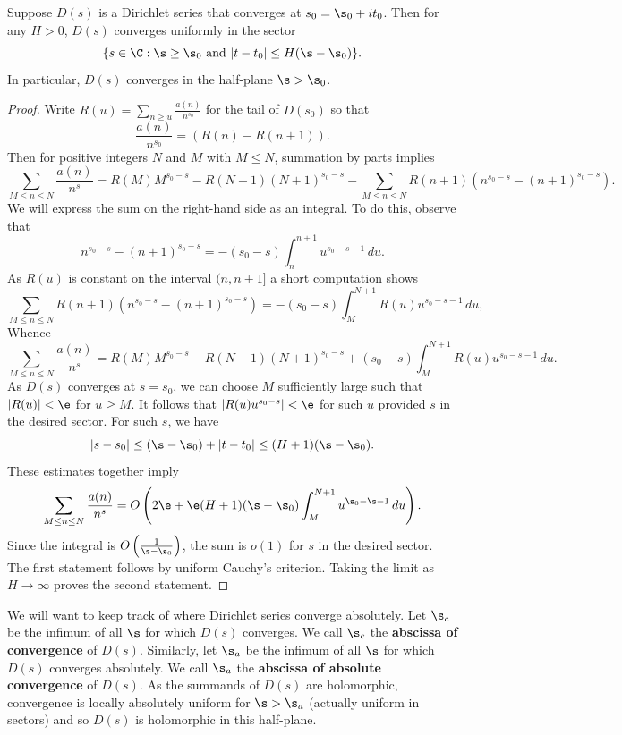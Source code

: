 \documentclass[12pt]{article}
\begin{document}
      \begin{theorem}\label{thm:convergence_of_Dirichlet_series}
        Suppose \(D(s)\) is a Dirichlet series that converges at \(s_{0} = \s_{0}+it_{0}\). Then for any \(H > 0\), \(D(s)\) converges uniformly in the sector
        \[
          \{s \in \C:\s \ge \s_{0} \text{ and } |t-t_{0}| \le H(\s-\s_{0})\}.
        \]
        In particular, \(D(s)\) converges in the half-plane \(\s > \s_{0}\).
      \end{theorem}
      \begin{proof}
        Write \(R(u) = \sum_{n \ge u}\frac{a(n)}{n^{s_{0}}}\) for the tail of \(D(s_{0})\) so that
        \[
          \frac{a(n)}{n^{s_{0}}} = (R(n)-R(n+1)).
        \]
        Then for positive integers \(N\) and \(M\) with \(M \le N\), summation by parts implies
        \[
          \sum_{M \le n \le N}\frac{a(n)}{n^{s}} = R(M)M^{s_{0}-s}-R(N+1)(N+1)^{s_{0}-s}-\sum_{M \le n \le N}R(n+1)(n^{s_{0}-s}-(n+1)^{s_{0}-s}).
        \]
        We will express the sum on the right-hand side as an integral. To do this, observe that
        \[
          n^{s_{0}-s}-(n+1)^{s_{0}-s} = -(s_{0}-s)\int_{n}^{n+1}u^{s_{0}-s-1}\,du.
        \]
        As \(R(u)\) is constant on the interval \((n,n+1]\) a short computation shows
        \[
          \sum_{M \le n \le N}R(n+1)(n^{s_{0}-s}-(n+1)^{s_{0}-s}) = -(s_{0}-s)\int_{M}^{N+1}R(u)u^{s_{0}-s-1}\,du,
        \]
        Whence
        \[
          \sum_{M \le n \le N}\frac{a(n)}{n^{s}} = R(M)M^{s_{0}-s}-R(N+1)(N+1)^{s_{0}-s}+(s_{0}-s)\int_{M}^{N+1}R(u)u^{s_{0}-s-1}\,du.
        \]
        As \(D(s)\) converges at \(s = s_{0}\), we can choose \(M\) sufficiently large such that \(|R(u)| < \e\) for \(u \ge M\). It follows that \(|R(u)u^{s_{0}-s}| < \e\) for such \(u\) provided \(s\) in the desired sector. For such \(s\), we have
        \[
          |s-s_{0}| \le (\s-\s_{0})+|t-t_{0}| \le (H+1)(\s-\s_{0}).
        \]
        These estimates together imply
        \[
          \sum_{M \le n \le N}\frac{a(n)}{n^{s}} = O\left(2\e+\e(H+1)(\s-\s_{0})\int_{M}^{N+1}u^{\s_{0}-\s-1}\,du\right).
        \]
        Since the integral is \(O\left(\frac{1}{\s-\s_{0}}\right)\), the sum is \(o(1)\) for \(s\) in the desired sector. The first statement follows by uniform Cauchy's criterion. Taking the limit as \(H \to \infty\) proves the second statement. 
      \end{proof}
      
      We will want to keep track of where Dirichlet series converge absolutely. Let \(\s_{c}\) be the infimum of all \(\s\) for which \(D(s)\) converges. We call \(\s_{c}\) the \textbf{abscissa of convergence} of \(D(s)\). Similarly, let \(\s_{a}\) be the infimum of all \(\s\) for which \(D(s)\) converges absolutely. We call \(\s_{a}\) the \textbf{abscissa of absolute convergence} of \(D(s)\). As the summands of \(D(s)\) are holomorphic, convergence is locally absolutely uniform for \(\s > \s_{a}\) (actually uniform in sectors) and so \(D(s)\) is holomorphic in this half-plane.  
      
\end{document}

